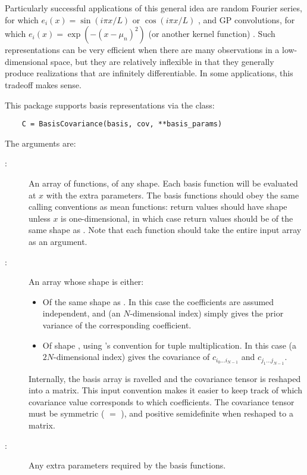 \documentclass[article]{jss}
\begin{document}
Particularly successful applications of this general idea are random Fourier series, for which $e_i(x) = \sin(i\pi x/L)$ or $\cos(i\pi x/L)$ \citep{spanos}, and GP convolutions, for which $e_i(x) = \exp(-(x-\mu_n)^2)$ (or another kernel function) \citep{convolution}. Such representations can be very efficient when there are many observations in a low-dimensional space, but they are relatively inflexible in that they generally produce realizations that are infinitely differentiable. In some applications, this tradeoff makes sense.

This package supports basis representations via the  class:
\begin{verbatim}
    C = BasisCovariance(basis, cov, **basis_params)
\end{verbatim}
The arguments are:
\begin{description}
    \item[:] An array of functions, of any shape. Each basis function will be evaluated at $x$ with the extra parameters. The basis functions should obey the same calling conventions as mean functions: return values should have shape  unless $x$ is one-dimensional, in which case return values should be of the same shape as . Note that each function should take the entire input array as an argument.
    \item[:] An array whose shape is either:
        \begin{itemize}
            \item Of the same shape as . In this case the coefficients are assumed independent, and  (an $N$-dimensional index) simply gives the prior variance of the corresponding coefficient.
            \item Of shape , using 's convention for tuple multiplication. In this case  (a $2N$-dimensional index) gives the covariance of $c_{i_0\ldots i_{N-1}}$ and $c_{j_1\ldots j_{N-1}}$.
        \end{itemize}
        Internally, the basis array is ravelled and the covariance tensor is reshaped into a matrix. This input convention makes it easier to keep track of which covariance value corresponds to which coefficients. The covariance tensor must be symmetric ( $=$ ), and positive semidefinite when reshaped to a matrix.
    \item[:] Any extra parameters required by the basis functions.
\end{description}
\end{document}
